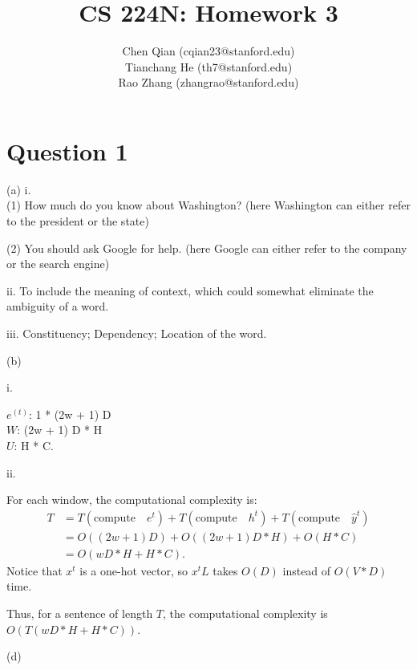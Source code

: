 \documentclass{article}
\theoremstyle{definition}
\theoremstyle{remark}
\numberwithin{equation}{section}
\begin{document}
\title{CS 224N: Homework 3}
\author{Chen Qian (cqian23@stanford.edu)\\
Tianchang He (th7@stanford.edu)\\
Rao Zhang (zhangrao@stanford.edu)}
\date{}
\maketitle

\section*{Question 1}

(a) 
i. \\
(1) How much do you know about Washington? (here Washington can either refer to the president or the state)

(2) You should ask Google for help. (here Google can either refer to the company or the search engine)
 
 \vspace{10pt}
 
 ii. To include the meaning of context, which could somewhat eliminate the ambiguity of a word.
 
 \vspace{10pt}
 
 iii. Constituency; Dependency; Location of the word.
 
 \newpage
 (b) 
 
 i.
 
 $e^{(t)}$: 1 * (2w + 1) D \\
 $W$: (2w + 1) D * H \\
 $U$: H * C.
 
 ii.
 
 For each window, the computational complexity is: 
 \begin{align*}
 T &=  T(\text{compute} \quad e^{t})  + T(\text{compute}  \quad h^{t}) +  T(\text{compute} \quad  \hat{y}^{t}) \\
    &= O((2w + 1)D) + O((2w + 1) D * H) + O(H*C) \\
    &= O ( wD * H + H *C ).
 \end{align*}
Notice that $x^{t}$ is a one-hot vector, so $x^{t}L$ takes $O(D)$ instead of $O(V*D)$ time.

Thus, for a sentence of length $T$, the computational complexity is $O ( T (w D * H + H *C) )$.


\newpage
 (d)
 
\end{document}
